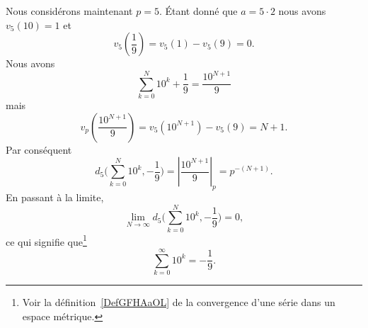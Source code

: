 Nous considérons maintenant \( p=5\). Étant donné que \( a=5\cdot 2\) nous avons \( v_5(10)=1\) et
\begin{equation}
	v_5\left( \frac{1}{ 9 } \right)=v_5(1)-v_5(9)=0.
\end{equation}
Nous avons
\begin{equation}
	\sum_{k=0}^N10^k+\frac{1}{ 9 }=\frac{ 10^{N+1} }{ 9 }
\end{equation}
mais
\begin{equation}
	v_p\left( \frac{ 10^{N+1} }{ 9 } \right)=v_5(10^{N+1})-v_5(9)=N+1.
\end{equation}
Par conséquent
\begin{equation}
	d_5\big( \sum_{k=0}^N10^k,-\frac{1}{ 9 } \big)=| \frac{ 10^{N+1} }{ 9 } |_p=p^{-(N+1)}.
\end{equation}
En passant à la limite,
\begin{equation}
	\lim_{N\to \infty} d_5\big( \sum_{k=0}^N10^k,-\frac{1}{ 9 } \big)=0,
\end{equation}
ce qui signifie que\footnote{Voir la définition~\ref{DefGFHAaOL} de la convergence d'une série dans un espace métrique.}
\begin{equation}
	\sum_{k=0}^{\infty}10^k=-\frac{1}{ 9 }.
\end{equation}
